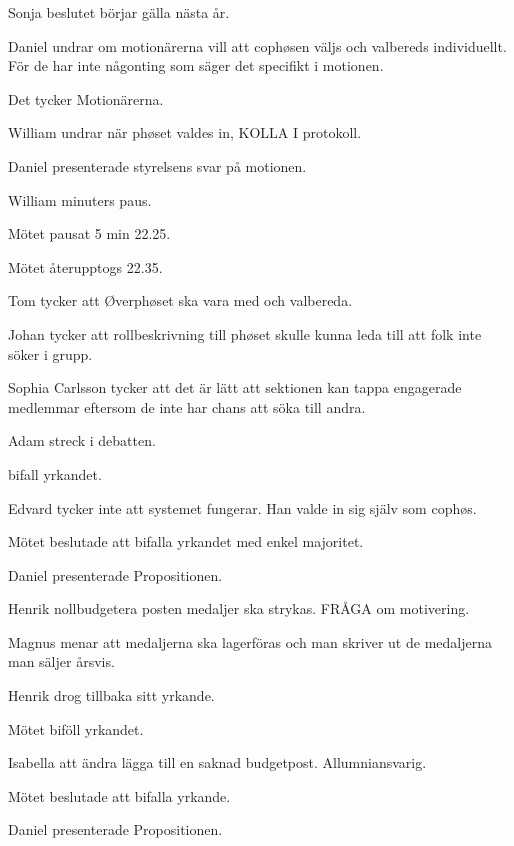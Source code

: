 \documentclass[10pt]{article}
\begin{document}
\begin{paragrafer}
\begin{paragrafer}
		Sonja \ypa beslutet börjar gälla nästa år. 
		
		Daniel undrar om motionärerna vill att cophøsen väljs och valbereds individuellt. För de har inte någonting som säger det specifikt i motionen.

		Det tycker Motionärerna.

		William undrar när phøset valdes in, KOLLA I protokoll. 

		Daniel presenterade styrelsens svar på motionen. 

		William  minuters paus. 

		Mötet pausat 5 min 22.25. 

		Mötet återupptogs 22.35.

		Tom tycker att Øverphøset ska vara med och valbereda. 

		Johan tycker att rollbeskrivning till phøset skulle kunna leda till att folk inte söker i grupp. 

		Sophia Carlsson tycker att det är lätt att sektionen kan tappa engagerade medlemmar eftersom de inte har chans att söka till andra.

		Adam \ypa streck i debatten. 

		\Mba bifall yrkandet. 

		Edvard tycker inte att systemet fungerar. Han valde in sig själv som cophøs. 

		Mötet beslutade att bifalla yrkandet med enkel majoritet. 


	\end{paragrafer}
    \begin{paragrafer}

		
		Daniel presenterade Propositionen.

		Henrik \ypa nollbudgetera posten medaljer ska strykas. FRÅGA om motivering.

		Magnus menar att medaljerna ska lagerföras och man skriver ut de medaljerna man säljer årsvis.

		Henrik drog tillbaka sitt yrkande. 

		Mötet biföll yrkandet.

		Isabella \ypa att ändra lägga till en saknad budgetpost. Allumniansvarig. 

		Mötet beslutade att bifalla yrkande.

		
		Daniel presenterade Propositionen.
		

\end{paragrafer}
\end{paragrafer}
\end{document}
